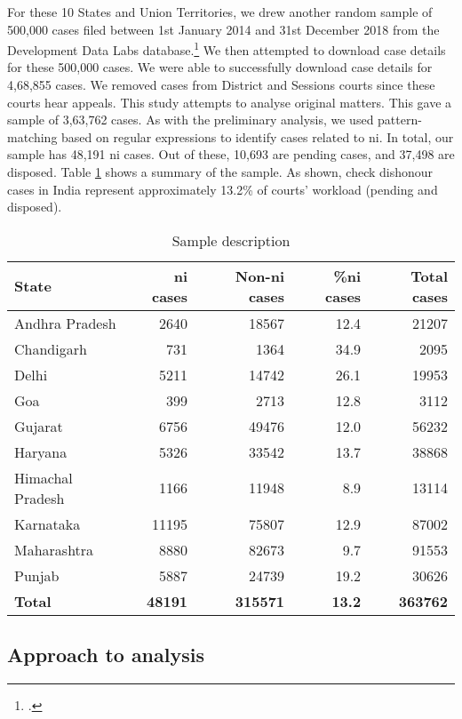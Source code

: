 For these 10 States and Union Territories, we drew another random sample of 500,000 cases filed between 1st January 2014 and 31st December 2018 from the Development Data Labs database.\footcite{devdatalabs2021_eCourtsData} We then attempted to download case details for these 500,000 cases. We were able to successfully download case details for 4,68,855 cases. We removed cases from District and Sessions courts since these courts hear appeals. This study attempts to analyse original matters. This gave a sample of 3,63,762 cases. As with the preliminary analysis, we used pattern-matching based on regular expressions to identify cases related to \gls{ni}. In total, our sample has 48,191 \gls{ni} cases. Out of these, 10,693 are pending cases, and 37,498 are disposed. Table \ref{tab:sample_desc} shows a summary of the sample. As shown, check dishonour cases in India represent approximately 13.2\% of courts' workload (pending and disposed).

{\footnotesize \begin{longtable}{@{}lrrr|r@{}}
\caption{Sample description}
\label{tab:sample_desc}\\
\toprule
\textbf{State} & \textbf{\gls{ni} cases} & \textbf{Non-\gls{ni} cases} & \textbf{\%\gls{ni} cases} & \textbf{Total cases}\\ \midrule
\endhead
Andhra Pradesh & 2640 & 18567 & 12.4 & 21207\\
Chandigarh & 731 & 1364 & 34.9 & 2095\\
Delhi & 5211 & 14742 & 26.1 & 19953\\
Goa & 399 & 2713 & 12.8 & 3112\\
Gujarat & 6756 & 49476 & 12.0 & 56232\\
Haryana & 5326 & 33542 & 13.7 & 38868\\
Himachal Pradesh & 1166 & 11948 & 8.9 & 13114\\
Karnataka & 11195 & 75807 & 12.9 & 87002\\
Maharashtra & 8880 & 82673 & 9.7 & 91553\\
Punjab & 5887 & 24739 & 19.2 & 30626\\
\midrule
\textbf{Total} & \textbf{48191} & \textbf{315571} & \textbf{13.2} & \textbf{363762}\\ \bottomrule
\end{longtable}
}

\subsection{Approach to analysis} \label{sec:approach-analysis}

